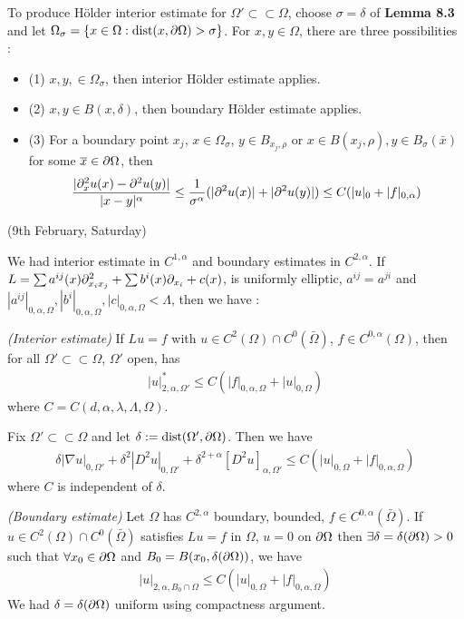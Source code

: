 \documentclass[12pt,a4paper]{article}
\renewenvironment{i}
{\begin{itemize} 
	}%
	{\end{itemize}
}
\begin{document}
To produce H\"older interior estimate for $\Omega' \subset\subset \Omega$, choose $\sigma = \delta$ of \textbf{Lemma 8.3}  and let $\Omega_{\sigma} = \{x\in \Omega : \text{dist}(x, \partial \Omega)>\sigma\}$. For $x, y\in \Omega$, there are three possibilities :
\begin{i}
\item[(1)] $x,y,\in \Omega_{\sigma}$, then interior H\"older estimate applies.
\item[(2)] $x,y\in B(x,\delta)$, then boundary H\"older estimate applies.
\item[(3)] For a boundary point $x_j$, $x\in \Omega_{\sigma}$, $y\in B_{x_j, \rho}$ or $x\in B(x_j, \rho), y\in B_{\sigma}(\bar{x})$ for some $\overline{x}\in \partial \Omega$, then
\begin{align*}
\frac{|\partial_x^2 u(x) - \partial^2_{}u(y)|}{|x-y|^{\alpha}} \leq \frac{1}{\sigma^{\alpha}}(|\partial^2 u(x)|+ |\partial^2 u(y)|) \leq C(|u|_0 + |f|_{0, \alpha})
\end{align*} 
\end{i}
\s

\newday

(9th February, Saturday)
\s

We had interior estimate in $C^{1, \alpha}$ and boundary estimates in $C^{2, \alpha}$. If $L = \sum a^{ij}(x) \partial^2_{x_i x_j} + \sum b^i(x) \partial_{x_i} + c(x)$, is uniformly elliptic, $a^{ij} =a^{ji}$ and $|a^{ij}|_{0, \alpha, \Omega}, |b^i|_{0, \alpha, \Omega}, |c|_{0, \alpha, \Omega}< \Lambda$, then we have :
\s

 \emph{(Interior estimate)} If $Lu =f$ with $u\in C^2(\Omega)\cap C^0 (\bar{\Omega})$, $f\in C^{0, \alpha}(\Omega)$, then for all $\Omega'\subset \subset \Omega$, $\Omega'$ open, has
\begin{align*}
|u|^*_{2, \alpha, \Omega'} \leq C(|f|_{0, \alpha, \Omega} + |u|_{0, \Omega})
\end{align*}
where $C =C(d, \alpha, \lambda, \Lambda, \Omega)$.
\s

\corr Fix $\Omega'\subset\subset \Omega$ and let $\delta := \text{dist}(\Omega', \partial \Omega)$. Then we have
\begin{align*}
\delta|\nabla u|_{0, \Omega'} + \delta^2 |D^2 u|_{0, \Omega'} + \delta^{2+ \alpha}[D^2 u]_{\alpha, \Omega'} \leq C (|u|_{0, \Omega} + |f|_{0, \alpha, \Omega})
\end{align*}
where $C$ is independent of $\delta$.
\s

 \emph{(Boundary estimate)} Let $\Omega$ has $C^{2, \alpha}$ boundary, bounded, $f\in C^{0, \alpha}(\bar{\Omega})$. If $u\in C^{2}(\Omega) \cap C^0(\bar{\Omega})$ satisfies $Lu =f$ in $\Omega$, $u= 0$ on $\partial \Omega$ then $\exists\delta = \delta(\partial \Omega) >0$ such that $\forall x_0 \in \partial \Omega$ and $B_0 = B(x_0, \delta(\partial \Omega))$, we have
\begin{align*}
|u|_{2, \alpha, B_0 \cap \Omega} \leq C(|u|_{0, \Omega} + |f|_{0, \alpha, \Omega})
\end{align*}
We had $\delta = \delta(\partial \Omega)$ uniform using compactness argument.
\s
\end{document}
